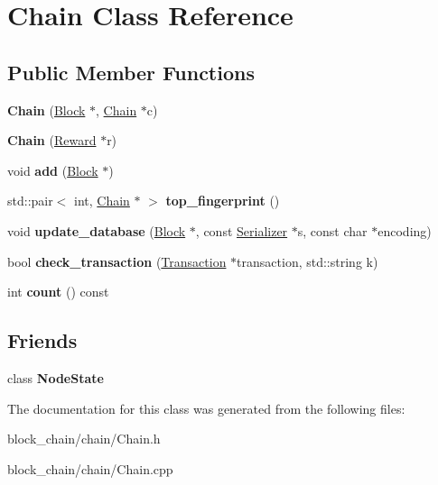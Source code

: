 \hypertarget{classChain}{}\section{Chain Class Reference}
\label{classChain}
\subsection*{Public Member Functions}
\begin{DoxyCompactItemize}
\item 
\mbox{\label{classChain_a851466afd0f86ef862ce36dd287546bf}} 
{\bfseries Chain} (\mbox{\hyperlink{classBlock}{Block}} $\ast$, \mbox{\hyperlink{classChain}{Chain}} $\ast$c)
\item 
\mbox{\label{classChain_a6779b5168023552f943c54baed7e7cd4}} 
{\bfseries Chain} (\mbox{\hyperlink{classReward}{Reward}} $\ast$r)
\item 
\mbox{\label{classChain_a1a8b5c5196b8b1c50f54349755721932}} 
void {\bfseries add} (\mbox{\hyperlink{classBlock}{Block}} $\ast$)
\item 
\mbox{\label{classChain_a5ee2e1efbfe8d2896b0ac836fb750362}} 
std\+::pair$<$ int, \mbox{\hyperlink{classChain}{Chain}} $\ast$ $>$ {\bfseries top\+\_\+fingerprint} ()
\item 
\mbox{\label{classChain_abeec0de116c442e6da59230a85a56724}} 
void {\bfseries update\+\_\+database} (\mbox{\hyperlink{classBlock}{Block}} $\ast$, const \mbox{\hyperlink{classSerializer}{Serializer}} $\ast$s, const char $\ast$encoding)
\item 
\mbox{\label{classChain_a5725ffa89b1f0333536238951d9acd91}} 
bool {\bfseries check\+\_\+transaction} (\mbox{\hyperlink{classTransaction}{Transaction}} $\ast$transaction, std\+::string k)
\item 
\mbox{\label{classChain_ad06a7e312123831339b614a74ff5c9e0}} 
int {\bfseries count} () const
\end{DoxyCompactItemize}
\subsection*{Friends}
\begin{DoxyCompactItemize}
\item 
\mbox{\label{classChain_adfdd1242f00ef4da9a9a01d996fc292c}} 
class {\bfseries Node\+State}
\end{DoxyCompactItemize}


The documentation for this class was generated from the following files\+:\begin{DoxyCompactItemize}
\item 
block\+\_\+chain/chain/Chain.\+h\item 
block\+\_\+chain/chain/Chain.\+cpp\end{DoxyCompactItemize}
